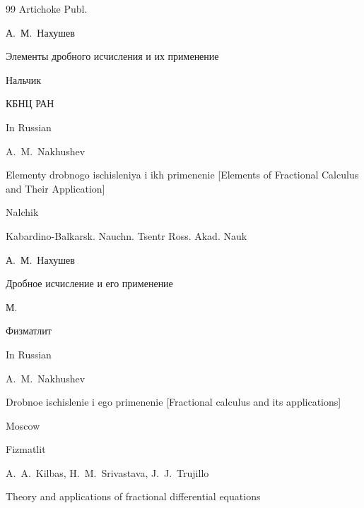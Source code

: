\begin{thebibliography}{99}
\publ Artichoke Publ.





\by А.~М.~Нахушев

\book Элементы дробного исчисления и их применение

\publaddr Нальчик

\publ КБНЦ РАН



\misctransl

\lang In Russian

\by A.~M.~Nakhushev

\book Elementy drobnogo ischisleniya i ikh primenenie \rm [Elements of Fractional Calculus and Their Application] 

\publaddr Nalchik

\publ Kabardino-Balkarsk. Nauchn. Tsentr Ross. Akad. Nauk








\by А.~М.~Нахушев

\book Дробное исчисление и его применение

\publaddr М.

\publ Физматлит




\misctransl

\lang In Russian

\by A.~M.~Nakhushev

\book Drobnoe ischislenie i ego primenenie \rm [Fractional calculus and its applications]

\publaddr Moscow

\publ Fizmatlit










\by A.~A.~Kilbas, H.~M.~Srivastava, J.~J.~Trujillo

\book Theory and applications of fractional differential equations


\end{thebibliography}
